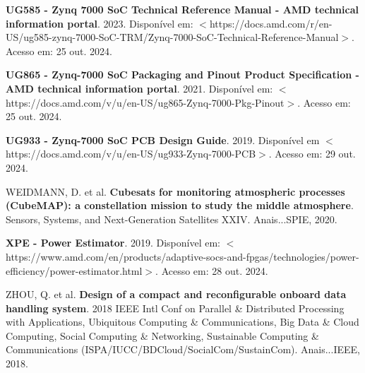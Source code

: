 \begin{flushleft}
\begin{thebibliography}{00}
 \textbf{UG585 - Zynq 7000 SoC Technical Reference Manual - AMD technical information portal}. 2023. Disponível em: $<$https://docs.amd.com/r/en-US/ug585-zynq-7000-SoC-TRM/Zynq-7000-SoC-Technical-Reference-Manual$>$. Acesso em: 25 out. 2024.

 \textbf{UG865 - Zynq-7000 SoC Packaging and Pinout Product Specification - AMD technical information portal}. 2021. Disponível em: $<$https://docs.amd.com/v/u/en-US/ug865-Zynq-7000-Pkg-Pinout$>$. Acesso em: 25 out. 2024.

 \textbf{UG933 - Zynq-7000 SoC PCB Design Guide}. 2019. Disponível em $<$https://docs.amd.com/v/u/en-US/ug933-Zynq-7000-PCB$>$. Acesso em: 29 out. 2024.

 WEIDMANN, D. et al. \textbf{Cubesats for monitoring atmospheric processes (CubeMAP): a constellation mission to study the middle atmosphere}. Sensors, Systems, and Next-Generation Satellites XXIV. Anais...SPIE, 2020.

 \textbf{XPE - Power Estimator}. 2019. Disponível em: $<$https://www.amd.com/en/products/adaptive-socs-and-fpgas/technologies/power-efficiency/power-estimator.html$>$. Acesso em: 28 out. 2024.

 ZHOU, Q. et al. \textbf{Design of a compact and reconfigurable onboard data handling system}. 2018 IEEE Intl Conf on Parallel \& Distributed Processing with Applications, Ubiquitous Computing \& Communications, Big Data \& Cloud Computing, Social Computing \& Networking, Sustainable Computing \& Communications (ISPA/IUCC/BDCloud/SocialCom/SustainCom). Anais...IEEE, 2018.


\end{thebibliography}
\end{flushleft}

